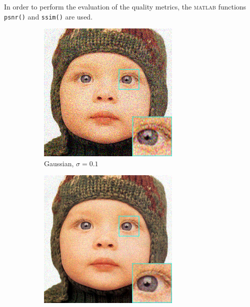 In order to perform the evaluation of the quality metrics, the \textsc{matlab} functions \texttt{psnr()} and \texttt{ssim()} are used.


\begin{figure}
	\centering
	\begin{subfigure}{0.24\textwidth}
		\includegraphics[width=\textwidth]{images/exp0.1/gaussian0.png}
		\caption{Gaussian, $\sigma=0.1$}
	\end{subfigure}
	\begin{subfigure}{0.24\textwidth}
		\includegraphics[width=\textwidth]{images/exp0.1/poisson0.png}

\end{subfigure}
\end{figure}
